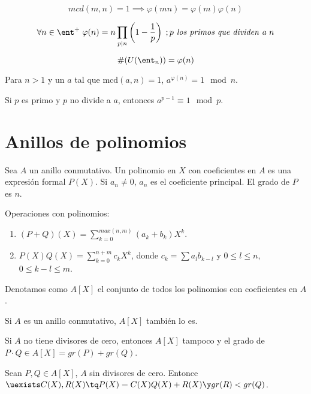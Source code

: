 \documentclass[nochap]{apuntes}
\begin{document}
\begin{defn}
\[ mcd(m,n)=1\implies \varphi(mn)=\varphi(m)\varphi(n) \]
\end{defn}

\begin{theorem}
\[\forall n\in \ent^+ \; \varphi(n)=n\prod_{p|n} \left(1-\frac{1}{p}\right)\; ; p \textit{ los primos que dividen a }n\]
\end{theorem}

\begin{lemma}
\[\#(U(\ent_n)) = \varphi (n) \]
\end{lemma}

\begin{theorem}
Para $n>1$ y un $a$ tal que $\mathrm{mcd}(a,n) =1$, $a^{\varphi(n)}=1 \mod n$.
\end{theorem}

\begin{theorem}
Si $p$ es primo y $p$ no divide a $a$, entonces $a^{p-1}\equiv 1 \mod p$.
\end{theorem}

\section{Anillos de polinomios}
\begin{defn}Sea $A$ un anillo conmutativo. Un polinomio en $X$ con coeficientes en $A$ es una expresión formal $P(X)$. Si $a_n \neq 0$, $a_n$ es el coeficiente principal. El grado de $P$ es $n$.\end{defn}

Operaciones con polinomios:
\begin{enumerate}
\item $(P+Q)(X) = \sum_{k=0}^{max(n,m)} (a_k+b_k)X^k$.
\item $P(X)Q(X) = \sum_{k=0}^{n+m} c_k X^k$, donde $c_k=\sum a_l b_{k-l}$ y $0\leq l \leq n$, $0\leq k-l\leq m$.
\end{enumerate}

\begin{defn} Denotamos como $A[X]$ el conjunto de todos los polinomios con coeficientes en $A$.\end{defn}

\begin{lemma}Si $A$ es un anillo conmutativo, $A[X]$ también lo es.

Si $A$ no tiene divisores de cero, entonces $A[X]$ tampoco y el grado de $P\cdot Q \in A[X] = gr(P) + gr(Q)$.

Sean $P, Q \in A[X]$, $A$ sin divisores de cero. Entonce $\uexists C(X), R(X) \tq P(X) = C(X)Q(X) + R(X) \y gr(R) < gr(Q)$.
\end{lemma}
\end{document}
